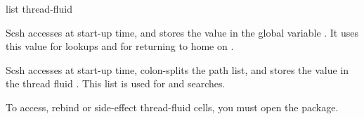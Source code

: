  \str
{} {{\str} list thread-fluid}
\begin{desc}
    Scsh accesses  at start-up time, and stores the value in the
    global variable . It uses this value for \ex{\~}
    lookups and for returning to home on .

    Scsh accesses  at start-up time, colon-splits the path list, and
    stores the value in the thread fluid . This list is
    used for  and  searches.

    To access, rebind or side-effect thread-fluid cells, you must open
    the  package.
\end{desc}



